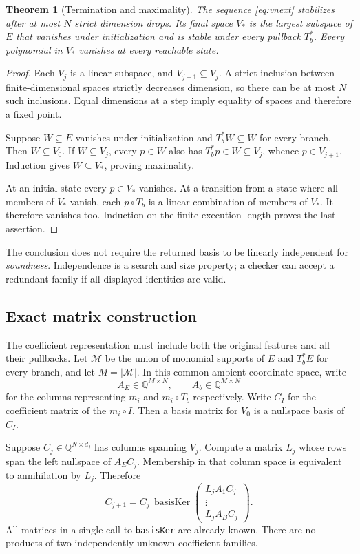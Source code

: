 \documentclass[11pt,letterpaper]{article}
\newcommand{\Q}{\mathbb Q}\newcommand{\R}{\mathbb R}\newcommand{\N}{\mathbb N}
\newcommand{\code}[1]{\texttt{#1}}
\newtheorem{theorem}{Theorem}[section]
\theoremstyle{definition}\newtheorem{definition}[theorem]{Definition}
\theoremstyle{remark}\newtheorem{remark}[theorem]{Remark}
\begin{document}
\begin{theorem}[Termination and maximality]
\label{thm:subspace}
The sequence \eqref{eq:vnext} stabilizes after at most $N$ strict dimension
drops. Its final space $V_*$ is the largest subspace of $E$ that vanishes under
initialization and is stable under every pullback $T_b^*$.
Every polynomial in $V_*$ vanishes at every reachable state.
\end{theorem}
\begin{proof}
Each $V_j$ is a linear subspace, and $V_{j+1}\subseteq V_j$. A strict inclusion
between finite-dimensional spaces strictly decreases dimension, so there can
be at most $N$ such inclusions. Equal dimensions at a step imply equality of
spaces and therefore a fixed point.

Suppose $W\subseteq E$ vanishes under initialization and $T_b^*W\subseteq W$
for every branch. Then $W\subseteq V_0$. If $W\subseteq V_j$, every $p\in W$
also has $T_b^*p\in W\subseteq V_j$, whence $p\in V_{j+1}$. Induction gives
$W\subseteq V_*$, proving maximality.

At an initial state every $p\in V_*$ vanishes. At a transition from a state
where all members of $V_*$ vanish, each $p\circ T_b$ is a linear combination of
members of $V_*$. It therefore vanishes too. Induction on the finite execution
length proves the last assertion.
\end{proof}

The conclusion does not require the returned basis to be linearly independent
for \emph{soundness}. Independence is a search and size property; a checker
can accept a redundant family if all displayed identities are valid.

\subsection{Exact matrix construction}
The coefficient representation must include both the original features and all
their pullbacks. Let $\mathcal M$ be the union of monomial supports of $E$ and
$T_b^*E$ for every branch, and let $M=|\mathcal M|$. In this common ambient
coordinate space, write
\[
 A_E\in\Q^{M\times N},\qquad A_b\in\Q^{M\times N}
\]
for the columns representing $m_i$ and $m_i\circ T_b$ respectively. Write
$C_I$ for the coefficient matrix of the $m_i\circ I$. Then a basis matrix for
$V_0$ is a nullspace basis of $C_I$.

Suppose $C_j\in\Q^{N\times d_j}$ has columns spanning $V_j$. Compute a matrix
$L_j$ whose rows span the left nullspace of $A_EC_j$. Membership in that column
space is equivalent to annihilation by $L_j$. Therefore
\begin{equation}
 C_{j+1}=C_j\,\operatorname{basisKer}
 \begin{pmatrix}
  L_jA_1C_j\\ \vdots\\ L_jA_BC_j
 \end{pmatrix}.
 \label{eq:matrixstep}
\end{equation}
All matrices in a single call to \code{basisKer} are already known. There are
no products of two independently unknown coefficient families.
\end{document}
